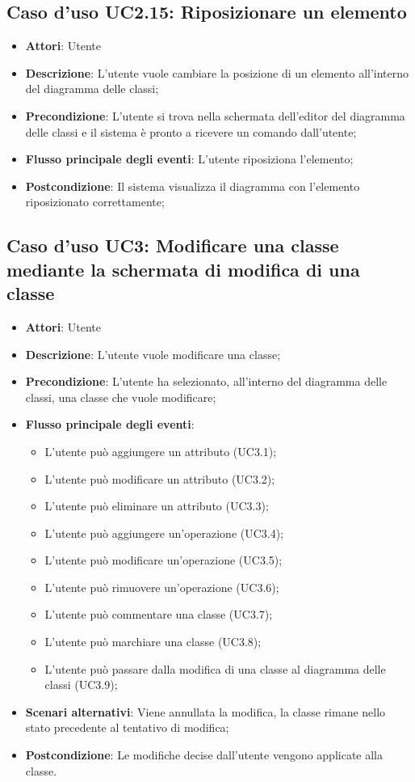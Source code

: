 \documentclass[../AnalisiDeiRequisiti.tex]{subfiles}
\begin{document}
		\subsection{Caso d'uso UC2.15: Riposizionare un elemento}
		\begin{itemize}
			\item \textbf{Attori}: Utente
			\item \textbf{Descrizione}: L'utente vuole cambiare la posizione di un elemento all'interno del diagramma delle classi;
			\item \textbf{Precondizione}: L'utente si trova nella schermata dell'editor del diagramma delle classi e il sistema è pronto a ricevere un comando dall'utente;
			\item \textbf{Flusso principale degli eventi}: L'utente riposiziona l'elemento;
			\item \textbf{Postcondizione}: Il sistema visualizza il diagramma con l'elemento riposizionato correttamente;
		\end{itemize}
		\subsection{Caso d'uso UC3: Modificare una classe mediante la schermata di modifica di una classe}
		\begin{itemize}
			\item \textbf{Attori}: Utente
			\item \textbf{Descrizione}: L'utente vuole modificare una classe;
			\item \textbf{Precondizione}: L'utente ha selezionato, all'interno del diagramma delle classi, una classe che vuole modificare;
			\item \textbf{Flusso principale degli eventi}: \begin{itemize}
				\item L'utente può aggiungere un attributo (UC3.1);
				\item L'utente può modificare un attributo (UC3.2);
				\item L'utente può eliminare un attributo (UC3.3);
				\item L'utente può aggiungere un'operazione (UC3.4);
				\item L'utente può modificare un'operazione (UC3.5);
				\item L'utente può rimuovere un'operazione (UC3.6);
				\item L'utente può commentare una classe (UC3.7);
				\item L'utente può marchiare una classe (UC3.8);
				\item L'utente può passare dalla modifica di una classe al diagramma delle classi (UC3.9);
			\end{itemize}
			\item \textbf{Scenari alternativi}: Viene annullata la modifica, la classe rimane nello stato precedente al tentativo di modifica;
			\item \textbf{Postcondizione}: Le modifiche decise dall'utente vengono applicate alla classe.
		\end{itemize}
\end{document}
